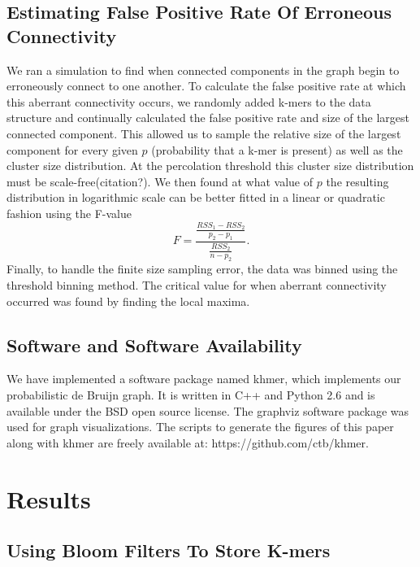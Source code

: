 \documentclass[12pt]{article} \usepackage{simplemargins}
\begin{document}
\subsection{Estimating False Positive Rate Of Erroneous Connectivity}
We ran a simulation to find when connected components in the graph 
begin to erroneously connect to one another.
To calculate the false positive rate at which this aberrant 
connectivity occurs, 
we randomly added k-mers to the data structure 
and continually calculated the false positive rate and size of 
the largest connected 
component. This allowed us to sample the relative size of 
the largest component for every 
given $p$ (probability that a k-mer is present) as well as the cluster size distribution. 
At the percolation threshold this cluster size distribution must be scale-free(citation?). 
We then found at what value of $p$ the resulting 
distribution in logarithmic 
scale can be better fitted in a linear or quadratic fashion using 
the F-value
\newline
\newline
\begin{displaymath}
F=\frac{\frac{RSS_1-RSS_2}{p_2-p_1}}{\frac{RSS_2}{n-p_2}}.
\end{displaymath}
Finally, to handle the finite size sampling error, the data was binned using the 
threshold binning method\cite{adami2002critical}. The critical value for 
when aberrant connectivity occurred was found by finding the local maxima.

\subsection{Software and Software Availability}
We have implemented a software package named khmer, which
implements our probabilistic de Bruijn graph.  It is written in C++
and Python 2.6 and is available under the BSD open source license. 
The graphviz software 
package was used for graph visualizations. The scripts to 
generate the figures of this paper along with khmer are freely available
at: https://github.com/ctb/khmer.

\section{Results}

\subsection{Using Bloom Filters To Store K-mers}
\end{document}

